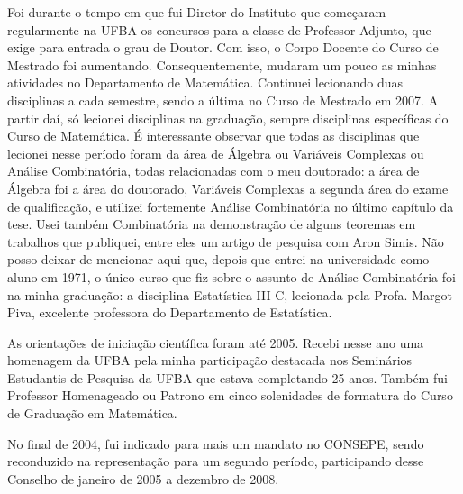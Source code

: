 \documentclass{hipatia}
\begin{document}
Foi durante o tempo em que fui Diretor do Instituto que
começaram regularmente na UFBA os concursos para a classe de
Professor Adjunto, que exige para entrada o grau de Doutor.
Com isso, o Corpo Docente do Curso de Mestrado foi
aumentando. Consequentemente, mudaram um pouco as minhas
atividades no Departamento de Matemática. Continuei
lecionando duas disciplinas a cada semestre, sendo a última
no Curso de Mestrado em 2007. A partir daí, só lecionei
disciplinas na graduação, sempre disciplinas específicas do
Curso de Matemática. É interessante observar que todas as
disciplinas que lecionei nesse período foram da área de
Álgebra ou Variáveis Complexas ou Análise Combinatória,
todas relacionadas com o meu doutorado: a área de Álgebra
foi a área do doutorado, Variáveis Complexas a segunda área
do exame de qualificação, e utilizei fortemente Análise
Combinatória no último capítulo da tese. Usei também
Combinatória na demonstração de alguns teoremas em trabalhos
que publiquei, entre eles um artigo de pesquisa com Aron
Simis. Não posso deixar de mencionar aqui que, depois que
entrei na universidade como aluno em 1971, o único curso que
fiz sobre o assunto de Análise Combinatória foi na minha
graduação: a disciplina Estatística III-C, lecionada pela
Profa. Margot Piva, excelente professora do Departamento de
Estatística.

As orientações de iniciação científica foram até 2005.
Recebi nesse ano uma homenagem da UFBA pela minha
participação destacada nos Seminários Estudantis de Pesquisa
da UFBA que estava completando 25 anos. Também fui Professor
Homenageado ou Patrono em cinco solenidades de formatura do
Curso de Graduação em Matemática.

No final de 2004, fui indicado para mais um mandato no
CONSEPE, sendo reconduzido na representação para um segundo
período, participando desse Conselho de janeiro de 2005 a
dezembro de 2008. 
\end{document}
